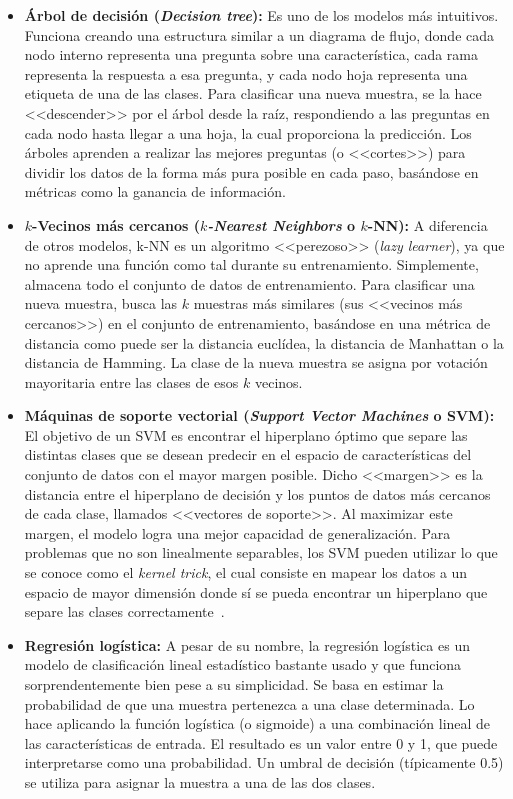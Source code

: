 \begin{itemize}
	\item \textbf{Árbol de decisión (\textit{Decision tree}):} Es uno de los modelos más intuitivos. Funciona creando una estructura similar a un diagrama de flujo, donde cada nodo interno representa una pregunta sobre una característica, cada rama representa la respuesta a esa pregunta, y cada nodo hoja representa una etiqueta de una de las clases. Para clasificar una nueva muestra, se la hace <<descender>> por el árbol desde la raíz, respondiendo a las preguntas en cada nodo hasta llegar a una hoja, la cual proporciona la predicción. Los árboles aprenden a realizar las mejores preguntas (o <<cortes>>) para dividir los datos de la forma más pura posible en cada paso, basándose en métricas como la ganancia de información.~\cite{breiman2017classification}
	
	\item \textbf{$k$-Vecinos más cercanos (\textit{$k$-Nearest Neighbors} o $k$-NN):} A diferencia de otros modelos, k-NN es un algoritmo <<perezoso>> (\textit{lazy learner}), ya que no aprende una función como tal durante su entrenamiento. Simplemente, almacena todo el conjunto de datos de entrenamiento. Para clasificar una nueva muestra, busca las $k$ muestras más similares (sus <<vecinos más cercanos>>) en el conjunto de entrenamiento, basándose en una métrica de distancia como puede ser la distancia euclídea, la distancia de Manhattan o la distancia de Hamming. La clase de la nueva muestra se asigna por votación mayoritaria entre las clases de esos $k$ vecinos.~\cite{cover1967nearest}
	
	\item \textbf{Máquinas de soporte vectorial (\textit{Support Vector Machines} o SVM):} El objetivo de un SVM es encontrar el hiperplano óptimo que separe las distintas clases que se desean predecir en el espacio de características del conjunto de datos con el mayor margen posible. Dicho <<margen>> es la distancia entre el hiperplano de decisión y los puntos de datos más cercanos de cada clase, llamados <<vectores de soporte>>. Al maximizar este margen, el modelo logra una mejor capacidad de generalización. Para problemas que no son linealmente separables, los SVM pueden utilizar lo que se conoce como el \textit{kernel trick}, el cual consiste en mapear los datos a un espacio de mayor dimensión donde sí se pueda encontrar un hiperplano que separe las clases correctamente~\cite{cortes1995support}.

	\item \textbf{Regresión logística:} A pesar de su nombre, la regresión logística es un modelo de clasificación lineal estadístico bastante usado y que funciona sorprendentemente bien pese a su simplicidad. Se basa en estimar la probabilidad de que una muestra pertenezca a una clase determinada. Lo hace aplicando la función logística (o sigmoide) a una combinación lineal de las características de entrada. El resultado es un valor entre 0 y 1, que puede interpretarse como una probabilidad. Un umbral de decisión (típicamente 0.5) se utiliza para asignar la muestra a una de las dos clases.
\end{itemize}


